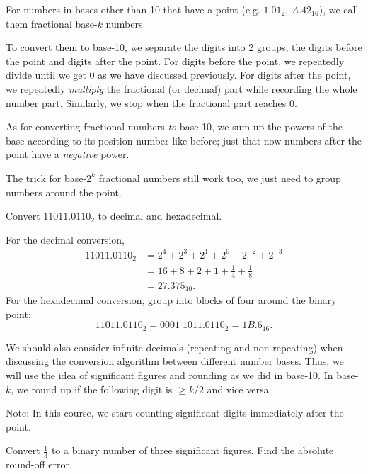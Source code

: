 For numbers in bases other than 10 that have a point (e.g. $1.01_{2}$, $A.42_{16}$), we call them fractional base-$k$ numbers.

To convert them to base-10, we separate the digits into 2 groups, the digits before the point and digits after the point. For digits before the point, we repeatedly divide until we get 0 as we have discussed previously. For digits after the point, we repeatedly \emph{multiply} the fractional (or decimal) part while recording the whole number part. Similarly, we stop when the fractional part reaches 0.

As for converting fractional numbers \textit{to} base-10, we sum up the powers of the base according to its position number like before; just that now numbers after the point have a \textit{negative} power.

The trick for base-$2^k$ fractional numbers still work too, we just need to group numbers around the point.

\begin{example}
Convert $11011.0110_2$ to decimal and hexadecimal.
\end{example}

\begin{solution}[4.0cm]
For the decimal conversion,
\[
\begin{aligned}
11011.0110_2
 &=2^4+2^3+2^1+2^0+2^{-2}+2^{-3}\\
 &=16+8+2+1+\frac14+\frac18\\
 &=27.375_{10}.
\end{aligned}
\]
For the hexadecimal conversion, group into blocks of four around the binary point:
\[
 11011.0110_2=0001\;1011.0110_2=1B.6_{16}.
\]
\end{solution}

We should also consider infinite decimals (repeating and non-repeating) when discussing the conversion algorithm between different number bases.
Thus, we will use the idea of significant figures and rounding as we did in base-10.
In base-$k$, we round up if the following digit is $\geq k/2$ and vice versa.

\medskip
\noindent Note: In this course, we start counting significant digits immediately after the point.

\begin{example}
    Convert $\displaystyle{\frac13}$ to a binary number of three significant figures. Find the absolute round-off error.
\end{example}

